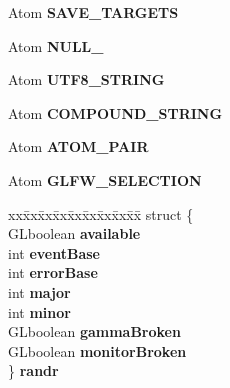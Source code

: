 \begin{DoxyCompactItemize}
\item 
\hypertarget{struct__GLFWlibraryX11_af37b7891322296d097e2c952cedde9b5}{}Atom {\bfseries S\+A\+V\+E\+\_\+\+T\+A\+R\+G\+E\+T\+S}\label{struct__GLFWlibraryX11_af37b7891322296d097e2c952cedde9b5}

\item 
\hypertarget{struct__GLFWlibraryX11_ad4ffbf25e4d673cd936a5ef1101bdae0}{}Atom {\bfseries N\+U\+L\+L\+\_\+}\label{struct__GLFWlibraryX11_ad4ffbf25e4d673cd936a5ef1101bdae0}

\item 
\hypertarget{struct__GLFWlibraryX11_a955444bef4fe657f50f760e48249abd4}{}Atom {\bfseries U\+T\+F8\+\_\+\+S\+T\+R\+I\+N\+G}\label{struct__GLFWlibraryX11_a955444bef4fe657f50f760e48249abd4}

\item 
\hypertarget{struct__GLFWlibraryX11_ab75a041cc080f8d949c94f1767c3c2c6}{}Atom {\bfseries C\+O\+M\+P\+O\+U\+N\+D\+\_\+\+S\+T\+R\+I\+N\+G}\label{struct__GLFWlibraryX11_ab75a041cc080f8d949c94f1767c3c2c6}

\item 
\hypertarget{struct__GLFWlibraryX11_a621773da402f65dacdabd837d7a2935d}{}Atom {\bfseries A\+T\+O\+M\+\_\+\+P\+A\+I\+R}\label{struct__GLFWlibraryX11_a621773da402f65dacdabd837d7a2935d}

\item 
\hypertarget{struct__GLFWlibraryX11_acae287b505539bbe8c9d1b7e1bbe087c}{}Atom {\bfseries G\+L\+F\+W\+\_\+\+S\+E\+L\+E\+C\+T\+I\+O\+N}\label{struct__GLFWlibraryX11_acae287b505539bbe8c9d1b7e1bbe087c}

\item 
\hypertarget{struct__GLFWlibraryX11_aee4d73ace11fbf1b79fdf8b7fb711061}{}\begin{tabbing}
xx\=xx\=xx\=xx\=xx\=xx\=xx\=xx\=xx\=\kill
struct \{\\
\>GLboolean {\bfseries available}\\
\>int {\bfseries eventBase}\\
\>int {\bfseries errorBase}\\
\>int {\bfseries major}\\
\>int {\bfseries minor}\\
\>GLboolean {\bfseries gammaBroken}\\
\>GLboolean {\bfseries monitorBroken}\\
\} {\bfseries randr}\label{struct__GLFWlibraryX11_aee4d73ace11fbf1b79fdf8b7fb711061}
\\


\end{tabbing}
\end{DoxyCompactItemize}
